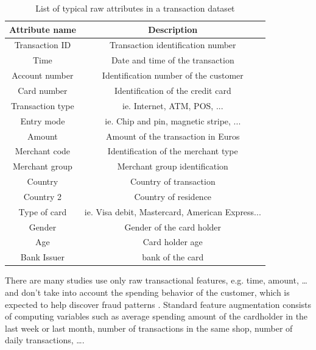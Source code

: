 \begin{table}
\centering
\footnotesize
\caption{List of typical raw attributes in a transaction dataset}
\label{tab:typical_raw_attributes}
\begin{center}
 \begin{tabular}{||c | c||} 
 \hline
 Attribute name & Description \\ [0.5ex] 
 \hline\hline
 Transaction ID & Transaction identification number \\ 
 \hline
 Time & Date and time of the transaction \\
 \hline
 Account number & Identification number of the customer \\
 \hline
 Card number & Identification of the credit card \\
 \hline
 Transaction type & ie. Internet, ATM, POS, ... \\
 \hline
Entry mode & ie. Chip and pin, magnetic stripe, ... \\
\hline
Amount & Amount of the transaction in Euros \\
\hline
Merchant code & Identification of the merchant type \\
\hline
Merchant group & Merchant group identification \\
\hline
Country & Country of transaction \\
\hline
Country 2 & Country of residence \\
\hline
Type of card & ie. Visa debit, Mastercard, American Express... \\
\hline
Gender & Gender of the card holder \\
\hline
Age & Card holder age \\
\hline
Bank Issuer & bank of the card \\
 [1ex] 
 \hline
\end{tabular}
\end{center}
\end{table}


There are many studies use only raw transactional features, e.g. time, amount, \dots and don't take into account the spending behavior of the customer, which is expected to help discover fraud patterns \citep{lebbe2008artificial}. Standard feature augmentation consists of computing variables such as average spending amount of the cardholder in the last week or last month, number of transactions in the same shop, number of daily transactions, \dots \citep{dal2014learned, krivko2010hybrid, whitrow2009transaction, bhattacharyya2011data, jha2012employing}.

